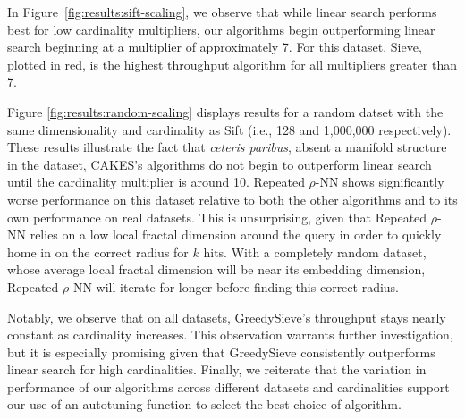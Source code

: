 In Figure~\ref{fig:results:sift-scaling}, we observe that while linear search performs best for low cardinality multipliers, our algorithms begin outperforming linear search beginning at a multiplier of approximately 7. 
For this dataset, Sieve, plotted in red, is the highest throughput algorithm for all multipliers greater than 7. 

Figure \ref{fig:results:random-scaling} displays results for a random datset with the same dimensionality and cardinality as Sift (i.e., 128 and 1,000,000 respectively). 
These results illustrate the fact that \emph{ceteris paribus}, absent a manifold structure in the dataset, CAKES's algorithms do not begin to outperform linear search until the cardinality multiplier is around 10. 
Repeated $\rho$-NN shows significantly worse performance on this dataset relative to both the other algorithms and to its own performance on real datasets. 
This is unsurprising, given that Repeated $\rho$-NN relies on a low local fractal dimension around the query in order to quickly home in on the correct radius for $k$ hits. 
With a completely random dataset, whose average local fractal dimension will be near its embedding dimension, Repeated $\rho$-NN will iterate for longer before finding this correct radius. 

Notably, we observe that on all datasets, GreedySieve's throughput stays nearly constant as cardinality increases. This observation warrants further investigation, but it is especially promising given that GreedySieve consistently outperforms linear search for high cardinalities. 
Finally, we reiterate that the variation in performance of our algorithms across different datasets and cardinalities support our use of an autotuning function to select the best choice of algorithm. 


